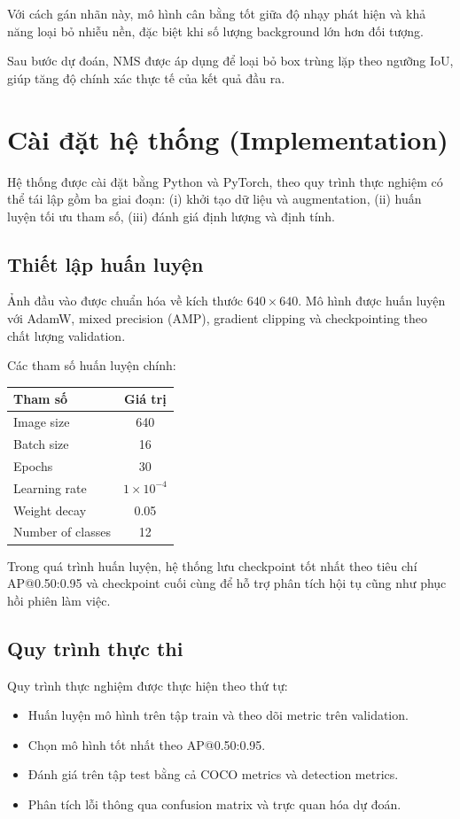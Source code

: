 \documentclass[12pt,a4paper]{article}
\begin{document}
Với cách gán nhãn này, mô hình cân bằng tốt giữa độ nhạy phát hiện và khả năng loại bỏ nhiễu nền, đặc biệt khi số lượng background lớn hơn đối tượng.

Sau bước dự đoán, NMS được áp dụng để loại bỏ box trùng lặp theo ngưỡng IoU, giúp tăng độ chính xác thực tế của kết quả đầu ra.

\section{Cài đặt hệ thống (Implementation)}

Hệ thống được cài đặt bằng Python và PyTorch, theo quy trình thực nghiệm có thể tái lập gồm ba giai đoạn: (i) khởi tạo dữ liệu và augmentation, (ii) huấn luyện tối ưu tham số, (iii) đánh giá định lượng và định tính.

\subsection{Thiết lập huấn luyện}

Ảnh đầu vào được chuẩn hóa về kích thước $640\times640$. Mô hình được huấn luyện với AdamW, mixed precision (AMP), gradient clipping và checkpointing theo chất lượng validation.

Các tham số huấn luyện chính:
\begin{table}[H]
\centering
\begin{tabular}{|l|c|}
\hline
\textbf{Tham số} & \textbf{Giá trị} \\
\hline
Image size & 640 \\
Batch size & 16 \\
Epochs & 30 \\
Learning rate & $1\times10^{-4}$ \\
Weight decay & 0.05 \\
Number of classes & 12 \\
\hline
\end{tabular}
\end{table}

Trong quá trình huấn luyện, hệ thống lưu checkpoint tốt nhất theo tiêu chí AP@0.50:0.95 và checkpoint cuối cùng để hỗ trợ phân tích hội tụ cũng như phục hồi phiên làm việc.

\subsection{Quy trình thực thi}

Quy trình thực nghiệm được thực hiện theo thứ tự:
\begin{itemize}
    \item Huấn luyện mô hình trên tập train và theo dõi metric trên validation.
    \item Chọn mô hình tốt nhất theo AP@0.50:0.95.
    \item Đánh giá trên tập test bằng cả COCO metrics và detection metrics.
    \item Phân tích lỗi thông qua confusion matrix và trực quan hóa dự đoán.
\end{itemize}
\end{document}
